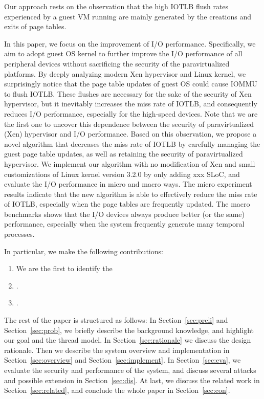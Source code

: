 Our approach rests on the observation that the high IOTLB flush rates experienced by a guest VM running 
are mainly generated by the creations and exits of page tables. 

In this paper, we focus on the improvement of I/O performance. Specifically, we aim to adopt guest OS kernel to further improve the I/O performance of all peripheral devices without sacrificing the security of the paravirtualized platforms. By deeply analyzing modern Xen hypervisor and Linux kernel, we surprisingly notice that the page table updates of guest OS could cause IOMMU to flush IOTLB. These flushes are necessary for the sake of the security of Xen hypervisor, but it inevitably increases the miss rate of IOTLB, and consequently reduces I/O performance, especially for the high-speed devices. Note that we are the first one to uncover this dependence between the security of paravirtualized (Xen) hypervisor and I/O performance. Based on this observation, we propose a novel algorithm that decreases the miss rate of IOTLB by carefully managing the guest page table updates, as well as retaining the security of paravirtualized hypervisor.
We implement our algorithm with no modification of Xen and small customizations of Linux kernel version 3.2.0 by only adding xxx SLoC, and evaluate the I/O performance in micro and macro ways. The micro experiment results indicate that the new algorithm is able to effectively reduce the miss rate of IOTLB, especially when the page tables are frequently updated. The macro benchmarks shows that the I/O devices always produce better (or the same) performance, especially when the system frequently generate many temporal processes.


In particular, we make the following contributions:
\begin{enumerate}
\item We are the first to identify the  
\item .
\item .
\end{enumerate}

The rest of the paper is structured as follows: In Section~\ref{sec:preli} and Section~\ref{sec:prob}, we briefly describe the background knowledge, and highlight our goal and the thread model. In Section~\ref{sec:rationale} we discuss the design rationale. Then we describe the system overview and implementation in Section~\ref{sec:overview} and Section~\ref{sec:implement}. In Section~\ref{sec:eva}, we evaluate the security and performance of the system, and discuss several attacks and possible extension in Section~\ref{sec:dis}. At last, we discuss the related work in Section~\ref{sec:related}, and conclude the whole paper in Section~\ref{sec:con}. 
